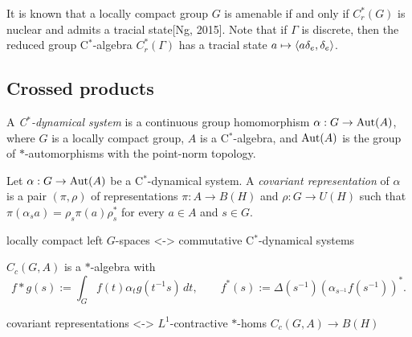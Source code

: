 \documentclass{../../../small}
\begin{document}
\begin{rmk}
It is known that a locally compact group $G$ is amenable if and only if $C_r^*(G)$ is nuclear and admits a tracial state[Ng, 2015].
Note that if $\Gamma$ is discrete, then the reduced group C$^*$-algebra $C_r^*(\Gamma)$ has a tracial state $a\mapsto\langle a\delta_e,\delta_e\rangle$.
\end{rmk}

\iffalse
General locally compact case:
For $G$ a connected Lie group, $C_r^*(G)$ is nuclear, but $G$ may not be amenable.

Theorem 3.7.11: $\Gamma$ with property (F) is amenable iff $C^*(\Gamma)$ is exact.
Chapter 5: When is $-\otimes_{\min}C_r^*(\Gamma)$ or $-\rtimes_r\Gamma$ exact?
\fi




\iffalse

\newpage
\subsection{Crossed products}

\begin{defn}
A \emph{C$^*$-dynamical system} is a continuous group homomorphism $\alpha:G\to\operatorname{Aut}(A)$, where $G$ is a locally compact group, $A$ is a C$^*$-algebra, and $\operatorname{Aut}(A)$ is the group of $*$-automorphisms with the point-norm topology.
\end{defn}
\begin{defn}
Let $\alpha:G\to\operatorname{Aut}(A)$ be a C$^*$-dynamical system.
A \emph{covariant representation} of $\alpha$ is a pair $(\pi,\rho)$ of representations $\pi:A\to B(H)$ and $\rho:G\to U(H)$ such that $\pi(\alpha_sa)=\rho_s\pi(a)\rho_s^*$ for every $a\in A$ and $s\in G$.
\end{defn}

locally compact left $G$-spaces <-> commutative C$^*$-dynamical systems


\begin{defn}

\end{defn}
$C_c(G, A)$ is a $*$-algebra
with
\[f*g(s):=\int_Gf(t)\alpha_tg(t^{-1}s)\,dt,\qquad f^*(s):=\Delta(s^{-1})(\alpha_{s^{-1}}f(s^{-1}))^*.\]

covariant representations <-> $L^1$-contractive $*$-homs $C_c(G, A)\to B(H)$
\begin{defn}

\end{defn}
\end{document}
